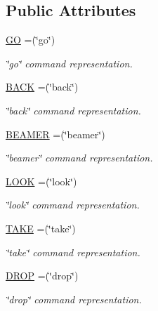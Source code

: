 \subsection*{Public Attributes}
\begin{DoxyCompactItemize}
\item 
\hyperlink{enumpkg__parsing_1_1CommandWord_a82b58f470d1dbcf2a9e5826632d66524}{G\-O} =(\char`\"{}go\char`\"{})
\begin{DoxyCompactList}\small\item\em \char`\"{}go\char`\"{} command representation. \end{DoxyCompactList}\item 
\hyperlink{enumpkg__parsing_1_1CommandWord_a7c6d90e3ff897725acfab8f68b28a1b1}{B\-A\-C\-K} =(\char`\"{}back\char`\"{})
\begin{DoxyCompactList}\small\item\em \char`\"{}back\char`\"{} command representation. \end{DoxyCompactList}\item 
\hyperlink{enumpkg__parsing_1_1CommandWord_a4d1c3647eaf81664624ed5effc590be4}{B\-E\-A\-M\-E\-R} =(\char`\"{}beamer\char`\"{})
\begin{DoxyCompactList}\small\item\em \char`\"{}beamer\char`\"{} command representation. \end{DoxyCompactList}\item 
\hyperlink{enumpkg__parsing_1_1CommandWord_a56f571b76d6ef6d6c64f9b2081b53e86}{L\-O\-O\-K} =(\char`\"{}look\char`\"{})
\begin{DoxyCompactList}\small\item\em \char`\"{}look\char`\"{} command representation. \end{DoxyCompactList}\item 
\hyperlink{enumpkg__parsing_1_1CommandWord_ae5353500b91f141ae399403b5e87cc28}{T\-A\-K\-E} =(\char`\"{}take\char`\"{})
\begin{DoxyCompactList}\small\item\em \char`\"{}take\char`\"{} command representation. \end{DoxyCompactList}\item 
\hyperlink{enumpkg__parsing_1_1CommandWord_abc97c312acca6eef77cc303d91d2d811}{D\-R\-O\-P} =(\char`\"{}drop\char`\"{})
\begin{DoxyCompactList}\small\item\em \char`\"{}drop\char`\"{} command representation. \end{DoxyCompactList}\item 

\end{DoxyCompactItemize}

